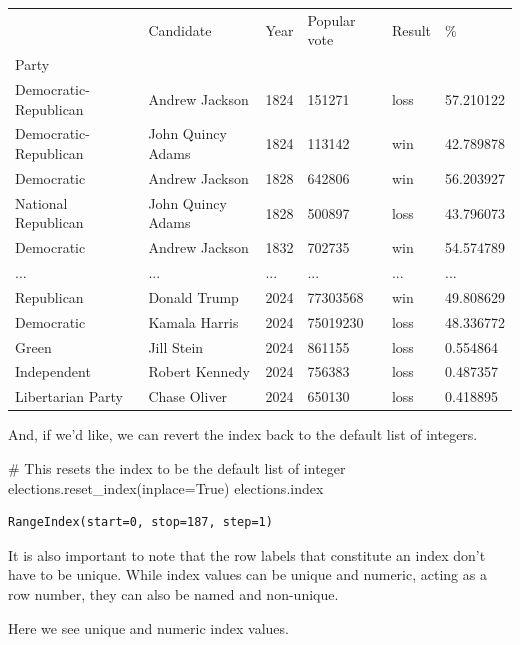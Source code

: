 \documentclass[
  letterpaper,
  DIV=11,
  numbers=noendperiod]{scrreprt}
\newenvironment{Shaded}{\begin{snugshade}}{\end{snugshade}}
\newcommand{\CommentTok}[1]{\textcolor[rgb]{0.37,0.37,0.37}{#1}}
\newcommand{\NormalTok}[1]{\textcolor[rgb]{0.00,0.23,0.31}{#1}}
\newcommand{\OperatorTok}[1]{\textcolor[rgb]{0.37,0.37,0.37}{#1}}
\newcommand{\VariableTok}[1]{\textcolor[rgb]{0.07,0.07,0.07}{#1}}
\begin{document}
\begin{longtable}[]{@{}llllll@{}}
\toprule\noalign{}
& Candidate & Year & Popular vote & Result & \% \\
Party & & & & & \\
\midrule\noalign{}
\endhead
\bottomrule\noalign{}
\endlastfoot
Democratic-Republican & Andrew Jackson & 1824 & 151271 & loss &
57.210122 \\
Democratic-Republican & John Quincy Adams & 1824 & 113142 & win &
42.789878 \\
Democratic & Andrew Jackson & 1828 & 642806 & win & 56.203927 \\
National Republican & John Quincy Adams & 1828 & 500897 & loss &
43.796073 \\
Democratic & Andrew Jackson & 1832 & 702735 & win & 54.574789 \\
... & ... & ... & ... & ... & ... \\
Republican & Donald Trump & 2024 & 77303568 & win & 49.808629 \\
Democratic & Kamala Harris & 2024 & 75019230 & loss & 48.336772 \\
Green & Jill Stein & 2024 & 861155 & loss & 0.554864 \\
Independent & Robert Kennedy & 2024 & 756383 & loss & 0.487357 \\
Libertarian Party & Chase Oliver & 2024 & 650130 & loss & 0.418895 \\
\end{longtable}

And, if we'd like, we can revert the index back to the default list of
integers.

\begin{Shaded}
\begin{Highlighting}[]
\CommentTok{\# This resets the index to be the default list of integer}
\NormalTok{elections.reset\_index(inplace}\OperatorTok{=}\VariableTok{True}\NormalTok{) }
\NormalTok{elections.index}
\end{Highlighting}
\end{Shaded}

\begin{verbatim}
RangeIndex(start=0, stop=187, step=1)
\end{verbatim}

It is also important to note that the row labels that constitute an
index don't have to be unique. While index values can be unique and
numeric, acting as a row number, they can also be named and non-unique.

Here we see unique and numeric index values.
\end{document}
